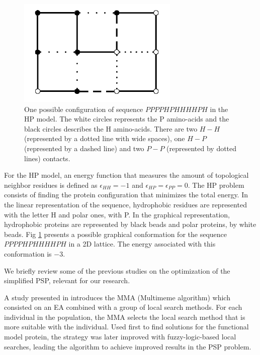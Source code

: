 \documentclass[conference]{IEEEtran}
\begin{document}
\begin{figure}[htb!] 
	\centering
	\includegraphics[scale=0.7]{figures/proteinExample.png}
	\caption{One possible configuration of  sequence $PPPPHPHHHHPH$ in the HP model. The white circles represents the P amino-acids and the black circles describes the H amino-acids. There are two $H-H$ (represented by a dotted line with wide spaces), one $H-P$ (represented by a dashed line) and  two $P-P$  (represented by dotted lines) contacts.}
	\label{fig:PROTEXAM}
\end{figure}




For the HP model, an energy function that  measures the amount of topological  neighbor residues is defined  as  $\epsilon_{HH}=-1$ and $\epsilon_{HP}=\epsilon_{PP}=0$. The HP problem consists of finding the protein configuration that minimizes the total energy. In the linear representation of the sequence, hydrophobic residues are represented with the letter H and polar ones, with P. In the graphical representation, hydrophobic proteins are represented  by black beads and polar proteins, by white beads.  Fig \ref{fig:PROTEXAM} presents a possible graphical conformation  for  the sequence  $PPPPHPHHHHPH$ in a 2D lattice. The energy associated with this conformation is $-3$. 


We briefly review some of the previous studies on the optimization of the simplified PSP, relevant for our research.


%


A study presented in \cite{krasnogor2002multimeme} introduces the MMA (Multimeme algorithm) which consisted on an EA combined with a
group of local search methods. For each individual in the population, the MMA selects the local search method that is more suitable with the individual. Used first to find solutions for the functional model protein, the strategy was later improved with fuzzy-logic-based local searches, leading the algorithm to achieve improved results in the PSP problem.
\end{document}
